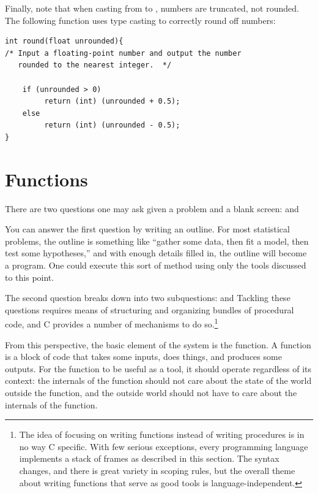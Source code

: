 \documentclass[12pt]{article}
\begin{document}
Finally, note that when casting from  to , numbers
are truncated, not rounded.  The following function uses type casting
to correctly round off numbers:

\begin{lstlisting}
int round(float unrounded){
/* Input a floating-point number and output the number
   rounded to the nearest integer.  */

    if (unrounded > 0)
         return (int) (unrounded + 0.5);
    else
         return (int) (unrounded - 0.5);
}
\end{lstlisting}
\lstset{numbers=none}



\section{Functions} \label{functional}

There are two questions one may ask given a problem and a blank screen:
 and 

You can answer the first question by writing an outline. For most
statistical problems, the outline is something like ``gather some data,
then fit a model, then test some hypotheses,'' and with enough details
filled in, the outline will become a program. One could execute this
sort of method using only the tools discussed to this point.

The second question breaks down into two subquestions:  and 
Tackling these questions requires means of structuring and organizing
bundles of procedural code, and C provides a number of mechanisms to
do so.\footnote{The idea of focusing on writing functions instead of
writing procedures is in no way C specific. With few serious exceptions,
every programming language implements a stack of frames as described in
this section. The syntax changes, and there is great variety in 
scoping rules, but the overall theme about writing functions that
serve as good tools is language-independent.}

From this perspective, the basic element of the system is the function.
A function is a block of code that takes some inputs, does things,
and produces some outputs. For the function to be useful as a tool, it
should operate regardless of its context: the internals of the function
should not care about the state of the world outside the function, and
the outside world should not have to care about the internals of the
function.
\end{document}
